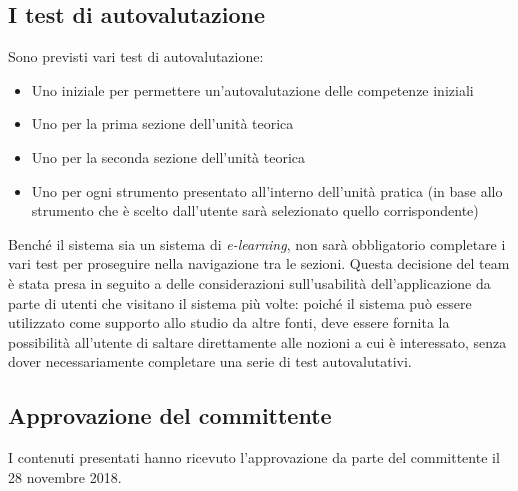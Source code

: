 \subsection{I test di autovalutazione}
Sono previsti vari test di autovalutazione:
\begin{itemize}
	\item Uno iniziale per permettere un'autovalutazione delle competenze
	iniziali
	\item Uno per la prima sezione dell'unità teorica
	\item Uno per la seconda sezione dell'unità teorica
	\item Uno per ogni strumento presentato all'interno dell'unità pratica (in
	base allo strumento che è scelto dall'utente sarà selezionato quello
	corrispondente)
\end{itemize}
Benché il sistema sia un sistema di \emph{e-learning}, non sarà obbligatorio
completare i vari test per proseguire nella navigazione tra le sezioni. Questa
decisione del team è stata presa in seguito a delle considerazioni
sull'usabilità dell'applicazione da parte di utenti che visitano il sistema più
volte: poiché il sistema può essere utilizzato come supporto allo studio da
altre fonti, deve essere fornita la possibilità all'utente di saltare
direttamente alle nozioni a cui è interessato, senza dover necessariamente
completare una serie di test autovalutativi.

\subsection*{Approvazione del committente}
I contenuti presentati hanno ricevuto l'approvazione da parte del committente il
28 novembre 2018.